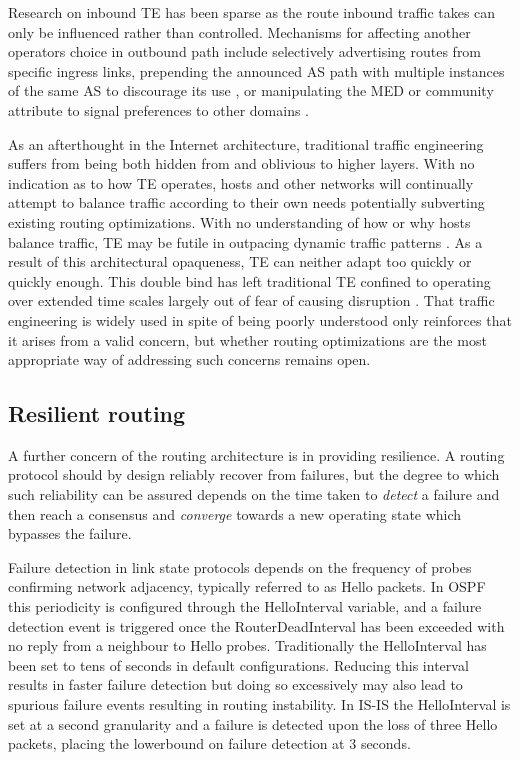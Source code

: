 Research on inbound \ac{TE} has been sparse as the route inbound traffic takes can only be influenced rather than controlled.
Mechanisms for affecting another operators choice in outbound path include selectively advertising routes from specific ingress links, prepending the announced \ac{AS} path with multiple instances of the same \ac{AS} to discourage its use \cite{Chang:2005p513}, or manipulating the \ac{MED} or community attribute to signal preferences to other domains \cite{Quoitin:2004p512}.


As an afterthought in the Internet architecture, traditional traffic engineering suffers from being both hidden from and oblivious to higher layers.
With no indication as to how \ac{TE} operates, hosts and other networks will continually attempt to balance traffic according to their own needs potentially subverting existing routing optimizations.
With no understanding of how or why hosts balance traffic, \ac{TE} may be futile in outpacing dynamic traffic patterns \cite{He:2006p504}.
As a result of this architectural opaqueness, \ac{TE} can neither adapt too quickly or quickly enough.
This double bind has left traditional \ac{TE} confined to operating over extended time scales largely out of fear of causing disruption \cite{Labovitz:1998p505}.
That traffic engineering is widely used in spite of being poorly understood only reinforces that it arises from a valid concern, but whether routing optimizations are the most appropriate way of addressing such concerns remains open.


\subsection{Resilient routing}

A further concern of the routing architecture is in providing resilience.
A routing protocol should by design reliably recover from failures, but the degree to which such reliability can be assured depends on the time taken to \emph{detect} a failure and then reach a consensus and \emph{converge} towards a new operating state which bypasses the failure.

Failure detection in link state protocols depends on the frequency of probes confirming network adjacency, typically referred to as Hello packets.
In \ac{OSPF} this periodicity is configured through the HelloInterval variable, and a failure detection event is triggered once the RouterDeadInterval has been exceeded with no reply from a neighbour to Hello probes.
Traditionally the HelloInterval has been set to tens of seconds in default configurations.
Reducing this interval results in faster failure detection \cite{Goyal:2003p515} but doing so excessively may also lead to spurious failure events resulting in routing instability.
In \ac{IS-IS} the HelloInterval is set at a second granularity and a failure is detected upon the loss of three Hello packets, placing the lowerbound on failure detection at 3 seconds.

